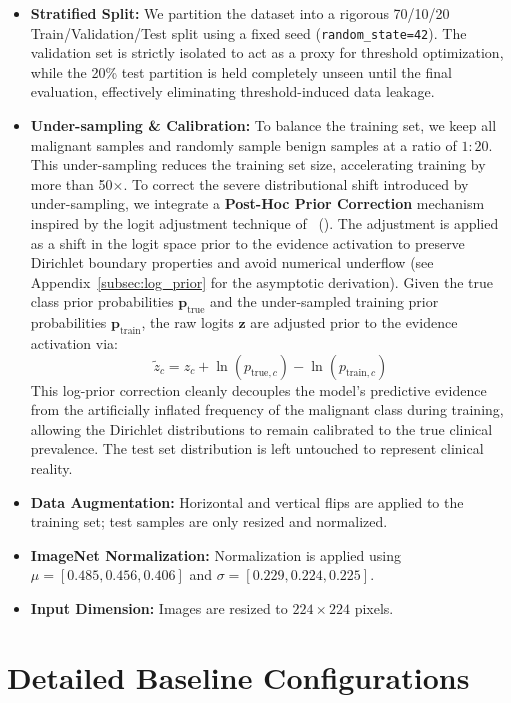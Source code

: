 \documentclass[letterpaper]{article} %
\begin{document}
\begin{itemize}
    \item \textbf{Stratified Split:} We partition the dataset into a rigorous 70/10/20 Train/Validation/Test split using a fixed seed (\texttt{random\_state=42}). The validation set is strictly isolated to act as a proxy for threshold optimization, while the 20\% test partition is held completely unseen until the final evaluation, effectively eliminating threshold-induced data leakage.
    \item \textbf{Under-sampling \& Calibration:} To balance the training set, we keep all malignant samples and randomly sample benign samples at a ratio of $1:20$. This under-sampling reduces the training set size, accelerating training by more than 50$\times$. To correct the severe distributional shift introduced by under-sampling, we integrate a \textbf{Post-Hoc Prior Correction} mechanism inspired by the logit adjustment technique of \citeauthor{menon2021long}~(\citeyear{menon2021long}). The adjustment is applied as a shift in the logit space prior to the evidence activation to preserve Dirichlet boundary properties and avoid numerical underflow (see Appendix~\ref{subsec:log_prior} for the asymptotic derivation). Given the true class prior probabilities $\mathbf{p}_{\text{true}}$ and the under-sampled training prior probabilities $\mathbf{p}_{\text{train}}$, the raw logits $\mathbf{z}$ are adjusted prior to the evidence activation via:
    \begin{equation}
        \tilde{z}_c = z_c + \ln(p_{\text{true}, c}) - \ln(p_{\text{train}, c})
    \end{equation}
    This log-prior correction cleanly decouples the model's predictive evidence from the artificially inflated frequency of the malignant class during training, allowing the Dirichlet distributions to remain calibrated to the true clinical prevalence. The test set distribution is left untouched to represent clinical reality.
    \item \textbf{Data Augmentation:} Horizontal and vertical flips are applied to the training set; test samples are only resized and normalized.
    \item \textbf{ImageNet Normalization:} Normalization is applied using $\mu = [0.485, 0.456, 0.406]$ and $\sigma = [0.229, 0.224, 0.225]$.
    \item \textbf{Input Dimension:} Images are resized to $224 \times 224$ pixels.
\end{itemize}


\section{Detailed Baseline Configurations}
\end{document}
